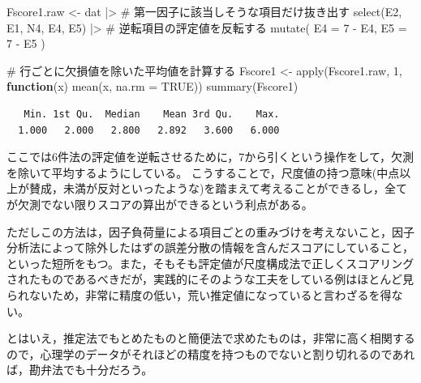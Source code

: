 \documentclass[
  a4paper,
]{ltjsbook}
\newenvironment{Shaded}{\begin{snugshade}}{\end{snugshade}}
\newcommand{\AttributeTok}[1]{\textcolor[rgb]{0.40,0.45,0.13}{#1}}
\newcommand{\CommentTok}[1]{\textcolor[rgb]{0.37,0.37,0.37}{#1}}
\newcommand{\ConstantTok}[1]{\textcolor[rgb]{0.56,0.35,0.01}{#1}}
\newcommand{\ControlFlowTok}[1]{\textcolor[rgb]{0.00,0.23,0.31}{\textbf{#1}}}
\newcommand{\DecValTok}[1]{\textcolor[rgb]{0.68,0.00,0.00}{#1}}
\newcommand{\FunctionTok}[1]{\textcolor[rgb]{0.28,0.35,0.67}{#1}}
\newcommand{\NormalTok}[1]{\textcolor[rgb]{0.00,0.23,0.31}{#1}}
\newcommand{\OtherTok}[1]{\textcolor[rgb]{0.00,0.23,0.31}{#1}}
\newcommand{\SpecialCharTok}[1]{\textcolor[rgb]{0.37,0.37,0.37}{#1}}
\newcommand{\StringTok}[1]{\textcolor[rgb]{0.13,0.47,0.30}{#1}}
\begin{document}
\begin{Shaded}
\begin{Highlighting}[]
\NormalTok{Fscore1.raw }\OtherTok{\textless{}{-}}\NormalTok{ dat }\SpecialCharTok{|\textgreater{}}
  \CommentTok{\# 第一因子に該当しそうな項目だけ抜き出す}
  \FunctionTok{select}\NormalTok{(E2, E1, N4, E4, E5) }\SpecialCharTok{|\textgreater{}}
  \CommentTok{\# 逆転項目の評定値を反転する}
  \FunctionTok{mutate}\NormalTok{(}
    \AttributeTok{E4 =} \DecValTok{7} \SpecialCharTok{{-}}\NormalTok{ E4,}
    \AttributeTok{E5 =} \DecValTok{7} \SpecialCharTok{{-}}\NormalTok{ E5}
\NormalTok{  )}

\CommentTok{\# 行ごとに欠損値を除いた平均値を計算する}
\NormalTok{Fscore1 }\OtherTok{\textless{}{-}} \FunctionTok{apply}\NormalTok{(Fscore1.raw, }\DecValTok{1}\NormalTok{, }\ControlFlowTok{function}\NormalTok{(x) }\FunctionTok{mean}\NormalTok{(x, }\AttributeTok{na.rm =} \ConstantTok{TRUE}\NormalTok{))}
\FunctionTok{summary}\NormalTok{(Fscore1)}
\end{Highlighting}
\end{Shaded}

\begin{verbatim}
   Min. 1st Qu.  Median    Mean 3rd Qu.    Max. 
  1.000   2.000   2.800   2.892   3.600   6.000 
\end{verbatim}

ここでは6件法の評定値を逆転させるために，7から引くという操作をして，欠測を除いて平均するようにしている。
こうすることで，尺度値の持つ意味(中点以上が賛成，未満が反対といったような)を踏まえて考えることができるし，全てが欠測でない限りスコアの算出ができるという利点がある。

ただしこの方法は，因子負荷量による項目ごとの重みづけを考えないこと，因子分析法によって除外したはずの誤差分散の情報を含んだスコアにしていること，といった短所をもつ。また，そもそも評定値が尺度構成法で正しくスコアリングされたものであるべきだが，実践的にそのような工夫をしている例はほとんど見られないため，非常に精度の低い，荒い推定値になっていると言わざるを得ない。

とはいえ，推定法でもとめたものと簡便法で求めたものは，非常に高く相関するので，心理学のデータがそれほどの精度を持つものでないと割り切れるのであれば，勘弁法でも十分だろう。

\begin{Shaded}
\end{Shaded}
\end{document}
